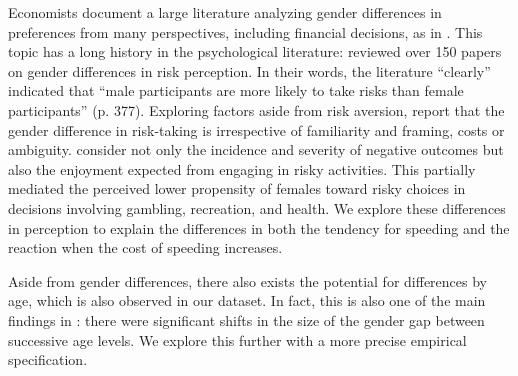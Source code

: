 % 
Economists
\citet{crosongneezy2009}
document a large literature 
analyzing gender differences in preferences from many perspectives, 
including financial decisions, as in
\citet{charnessgneezy2012}.   
% 
This topic has a long history in the psychological literature: 
\citet{byrnes1999}
reviewed
over 150 papers on gender differences in risk perception.
In their words, the literature ``clearly'' indicated that
``male participants are more likely to take risks than female
participants'' (p. 377). 
% 
Exploring factors aside from risk aversion, 
\citet{powellansic1997} report that the gender difference in risk-taking 
is irrespective of familiarity and framing, costs or ambiguity. 
% 
\citet{harris2006} 
consider not only the incidence and severity of
negative outcomes but also the enjoyment expected from 
engaging in risky activities. 
This 
partially mediated the perceived lower propensity of females
toward risky choices in decisions involving gambling, recreation, and health. 
We explore these differences in perception to explain 
the differences in both 
the tendency for speeding and 
the reaction when the cost of speeding increases. 


Aside from gender differences, 
there also exists the potential for differences by age, 
which is also observed in our dataset. 
%
In fact, this is also one of the main findings in 
\citet{byrnes1999}: 
there were significant shifts in the size of the gender gap between successive age levels.
% 
We explore this further with a more precise empirical specification. 


